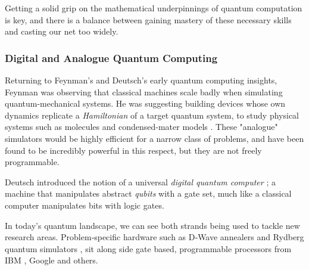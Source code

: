 Getting a solid grip on the mathematical underpinnings of quantum computation is key, 
and there is a balance between gaining mastery of these necessary skills and casting our net too widely.


\subsubsection{Digital and Analogue Quantum Computing}

Returning to Feynman's and Deutsch's early quantum computing insights, Feynman was observing that classical machines 
scale badly when simulating quantum-mechanical systems.  
He was suggesting building devices whose own dynamics replicate a \emph{Hamiltonian} of a target quantum system,
to study physical systems such as molecules and condensed-mater models \cite{Feynman:1986}.  
These "analogue" simulators would be highly efficient for a narrow class of problems, 
and have been found to be incredibly powerful in this respect,
but they are not freely programmable.

Deutsch introduced the notion of a universal \emph{digital quantum computer} \cite{Deutsch:1985}; 
a machine that manipulates abstract \emph{qubits} with a gate set, 
much like a classical computer manipulates bits with logic gates.

In today's quantum landscape, we can see both strands being used to tackle new research areas.
Problem‑specific hardware such as D‑Wave annealers \cite{DWave:QuantumAnnealing} 
and Rydberg quantum simulators \cite{Wu:2021}, 
sit along side gate based, programmable processors from IBM \cite{IBM:2016a}, Google \cite{Google:2024a} and others.




